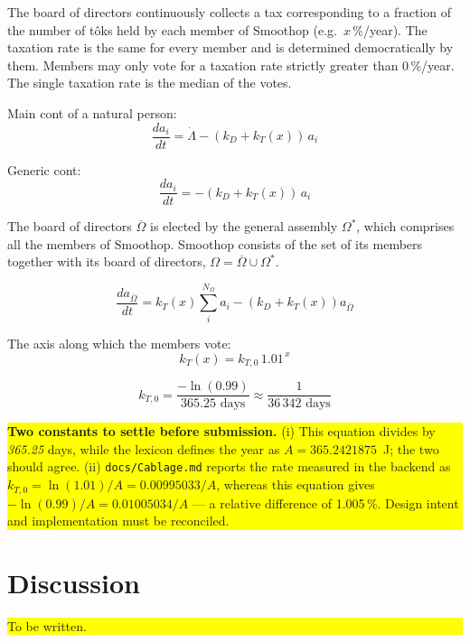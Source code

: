 \documentclass[letterpaper]{article}
\newcommand{\placeholder}[1]{%
  \par\smallskip\noindent
  \colorbox{yellow}{\parbox{\dimexpr\linewidth-2\fboxsep\relax}{#1}}%
  \par\smallskip}
\begin{document}
The board of directors continuously collects a tax corresponding to a fraction of the
number of t\^{o}ks held by each member of Smoothop (e.g.\ $x$\,\%/year). The taxation rate
is the same for every member and is determined democratically by them. Members may only
vote for a taxation rate strictly greater than 0\,\%/year. The single taxation rate is the
median of the votes.

Main cont of a natural person:
\begin{equation}
    \frac{d a_i}{dt} = \dot{\Lambda} -\left(k_D+k_T(x)\right) \, a_i
\end{equation}

Generic cont:
\begin{equation}
    \frac{d a_i}{dt} = - \left(k_D+k_T(x)\right) \, a_i
\end{equation}

The board of directors $\overline{\Omega}$ is elected by the general assembly $\Omega^*$,
which comprises all the members of Smoothop. Smoothop consists of the set of its members
together with its board of directors, $\Omega=\overline{\Omega}\cup\Omega^*$.

\begin{equation}
    \frac{d a_{\overline{\Omega}}}{dt} = k_T(x) \sum_i^{N_{\Omega}} a_i -  \left(k_D+k_T(x)\right) a_{\overline{\Omega}}
\end{equation}

The axis along which the members vote:
\begin{equation}
     k_T(x) = k_{T,0} \,1.01^{\,x}
\end{equation}

\begin{equation}
    k_{T,0} = \frac{-\ln(0.99)}{365.25 \text{ days}} \approx \frac{1}{36\,342\text{ days}}
\end{equation}

\placeholder{\textbf{Two constants to settle before submission.} (i) This equation divides
by \emph{365.25} days, while the lexicon defines the year as $A = 365.2421875$~J; the two
should agree. (ii) \texttt{docs/Cablage.md} reports the rate measured in the backend as
$k_{T,0} = \ln(1.01)/A = 0.00995033/A$, whereas this equation gives
$-\ln(0.99)/A = 0.01005034/A$ --- a relative difference of 1.005\,\%. Design intent and
implementation must be reconciled.}

\section{Discussion}
\placeholder{To be written.}
\end{document}

